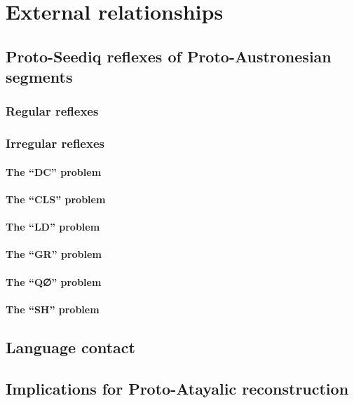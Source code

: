 \chapter{External relationships}

\section{Proto-Seediq reflexes of Proto-Austronesian segments}
\lipsum[1]
\subsection{Regular reflexes}
\lipsum[1]
\subsection{Irregular reflexes}
\lipsum[1]
\subsubsection{The ``DC'' problem}
\lipsum[1]
\subsubsection{The ``CLS'' problem}
\lipsum[1]
\subsubsection{The ``LD'' problem}
\lipsum[1]
\subsubsection{The ``GR'' problem}
\lipsum[1]
\subsubsection{The ``Q∅'' problem}
\lipsum[1]
\subsubsection{The ``SH'' problem}
\lipsum[1]

\section{Language contact}
\lipsum[1]


\section{Implications for Proto-Atayalic reconstruction}
\lipsum[1]

